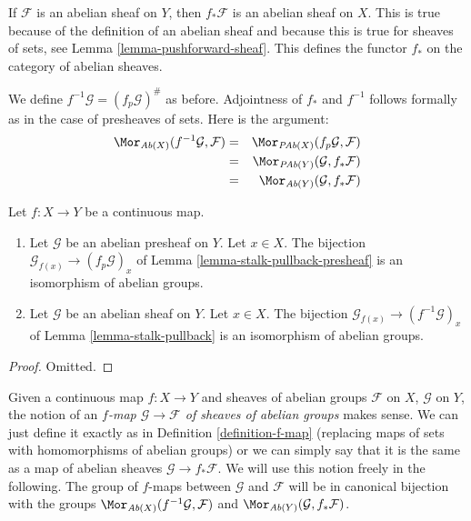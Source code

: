 \medskip\noindent
If $\mathcal{F}$ is an abelian sheaf on $Y$, then $f_*\mathcal{F}$
is an abelian sheaf on $X$. This is true because of the definition
of an abelian sheaf and because this is true for sheaves of sets,
see Lemma \ref{lemma-pushforward-sheaf}. This defines the functor
$f_*$ on the category of abelian sheaves.

\medskip\noindent
We define $f^{-1}\mathcal{G} = (f_p\mathcal{G})^\#$ as before.
Adjointness of $f_*$ and $f^{-1}$ follows formally as in
the case of presheaves of sets. Here is the argument:
\begin{eqnarray*}
\Mor_{\textit{Ab}(X)}(f^{-1}\mathcal{G}, \mathcal{F})
& = &
\Mor_{\textit{PAb}(X)}(f_p\mathcal{G}, \mathcal{F}) \\
& = &
\Mor_{\textit{PAb}(Y)}(\mathcal{G}, f_*\mathcal{F}) \\
& = &
\Mor_{\textit{Ab}(Y)}(\mathcal{G}, f_*\mathcal{F})
\end{eqnarray*}

\begin{lemma}
\label{lemma-pullback-abelian-stalk}
Let $f : X \to Y$ be a continuous map.
\begin{enumerate}
\item Let $\mathcal{G}$ be an abelian presheaf on $Y$.
Let $x \in X$. The bijection
$\mathcal{G}_{f(x)} \to (f_p\mathcal{G})_x$ of
Lemma \ref{lemma-stalk-pullback-presheaf} is an isomorphism of abelian groups.
\item Let $\mathcal{G}$ be an abelian sheaf on $Y$.
Let $x \in X$. The bijection
$\mathcal{G}_{f(x)} \to (f^{-1}\mathcal{G})_x$ of
Lemma \ref{lemma-stalk-pullback} is an isomorphism of abelian groups.
\end{enumerate}
\end{lemma}

\begin{proof}
Omitted.
\end{proof}

\noindent
Given a continuous map $f : X \to Y$ and sheaves of abelian
groups $\mathcal{F}$ on $X$, $\mathcal{G}$ on $Y$, the notion
of an {\it $f$-map $\mathcal{G} \to \mathcal{F}$
of sheaves of abelian groups} makes sense. We can just define
it exactly as in Definition \ref{definition-f-map} (replacing maps
of sets with homomorphisms of abelian groups) or we can
simply say that it is the same as a map of abelian
sheaves $\mathcal{G} \to f_*\mathcal{F}$. We will use this
notion freely in the following. The group of $f$-maps between
$\mathcal{G}$ and $\mathcal{F}$ will be in canonical bijection
with the groups
$\Mor_{\textit{Ab}(X)}(f^{-1}\mathcal{G}, \mathcal{F})$
and
$\Mor_{\textit{Ab}(Y)}(\mathcal{G}, f_*\mathcal{F})$.

